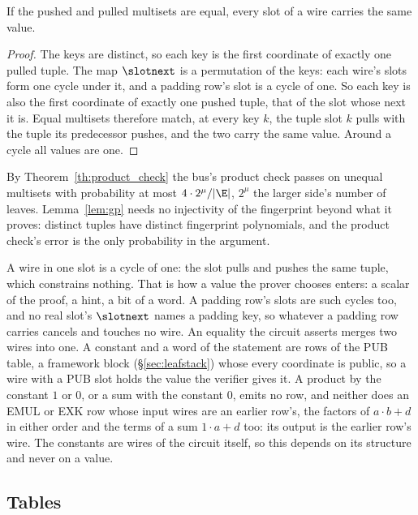 \begin{lemma}\label{lem:rec-cycles}
If the pushed and pulled multisets are equal, every slot of a wire carries the same value.
\end{lemma}
\begin{proof}
The keys are distinct, so each key is the first coordinate of exactly one pulled tuple. The map $\slotnext$ is a permutation of the keys: each wire's slots form one cycle under it, and a padding row's slot is a cycle of one. So each key is also the first coordinate of exactly one pushed tuple, that of the slot whose next it is. Equal multisets therefore match, at every key $k$, the tuple slot $k$ pulls with the tuple its predecessor pushes, and the two carry the same value. Around a cycle all values are one.
\end{proof}

By Theorem~\ref{th:product_check} the bus's product check passes on unequal multisets with probability at most $4\cdot2^{\mu}/|\E|$, $2^{\mu}$ the larger side's number of leaves. Lemma~\ref{lem:gp} needs no injectivity of the fingerprint beyond what it proves: distinct tuples have distinct fingerprint polynomials, and the product check's error is the only probability in the argument.

A wire in one slot is a cycle of one: the slot pulls and pushes the same tuple, which constrains nothing. That is how a value the prover chooses enters: a scalar of the proof, a hint, a bit of a word. A padding row's slots are such cycles too, and no real slot's $\slotnext$ names a padding key, so whatever a padding row carries cancels and touches no wire. An equality the circuit asserts merges two wires into one. A constant and a word of the statement are rows of the \textsf{PUB} table, a framework block (\S\ref{sec:leafstack}) whose every coordinate is public, so a wire with a \textsf{PUB} slot holds the value the verifier gives it. A product by the constant $1$ or $0$, or a sum with the constant $0$, emits no row, and neither does an \textsf{EMUL} or \textsf{EXK} row whose input wires are an earlier row's, the factors of $a\cdot b+d$ in either order and the terms of a sum $1\cdot a+d$ too: its output is the earlier row's wire. The constants are wires of the circuit itself, so this depends on its structure and never on a value.

\subsection{Tables}\label{rec:tables}

